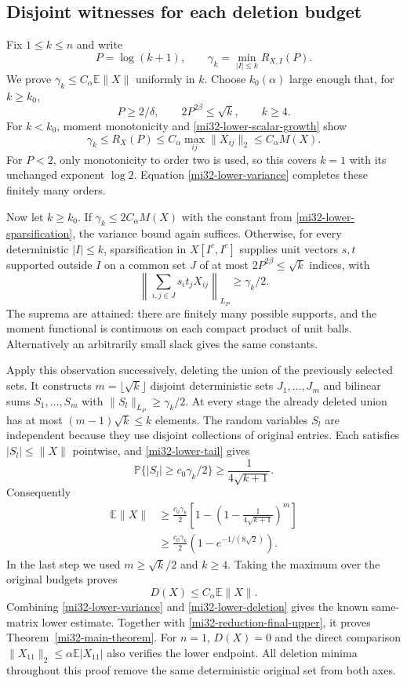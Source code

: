 \documentclass[11pt]{article}
\theoremstyle{definition}
\theoremstyle{remark}
\newcommand{\E}{\mathbb E}
\newcommand{\Prob}{\mathbb P}
\newcommand{\norm}[1]{\lVert#1\rVert}
\begin{document}
\subsection{Disjoint witnesses for each deletion budget}

Fix $1\le k\le n$ and write
\[
 P=\log(k+1),\qquad
 \gamma_k=\min_{|I|\le k}R_{X,I}(P).
\]
We prove $\gamma_k\le C_\alpha\E\norm{X}$ uniformly in $k$.
Choose $k_0(\alpha)$ large enough that, for $k\ge k_0$,
\[
 P\ge2/\delta,\qquad 2P^{2\beta}\le\sqrt k,\qquad k\ge4.
\]
For $k<k_0$, moment monotonicity and
\eqref{mi32-lower-scalar-growth} show
\[
 \gamma_k\le R_X(P)
 \le C_\alpha\max_{ij}\norm{X_{ij}}_2
 \le C_\alpha M(X).
\]
For $P<2$, only monotonicity to order two is used, so this covers
$k=1$ with its unchanged exponent $\log2$. Equation
\eqref{mi32-lower-variance} completes these finitely many orders.

Now let $k\ge k_0$. If $\gamma_k\le2C_\alpha M(X)$ with the
constant from \eqref{mi32-lower-sparsification}, the variance
bound again suffices. Otherwise, for every deterministic
$|I|\le k$, sparsification in $X[I^c,I^c]$ supplies unit vectors
$s,t$ supported outside $I$ on a common set $J$ of at most
$2P^{2\beta}\le\sqrt k$ indices, with
\[
 \left\|\sum_{i,j\in J}s_it_jX_{ij}\right\|_{L_P}
       \ge\gamma_k/2.
\]
The suprema are attained: there are finitely many possible supports,
and the moment functional is continuous on each compact product of
unit balls. Alternatively an arbitrarily small slack gives the
same constants.

Apply this observation successively, deleting the union of the
previously selected sets. It constructs
$m=\lfloor\sqrt k\rfloor$ disjoint deterministic sets $J_1,\ldots,J_m$
and bilinear sums $S_1,\ldots,S_m$ with
$\norm{S_l}_{L_P}\ge\gamma_k/2$. At every stage the already
deleted union has at most $(m-1)\sqrt k\le k$ elements.
The random variables $S_l$ are independent because they use disjoint
collections of original entries. Each satisfies $|S_l|\le\norm{X}$
pointwise, and \eqref{mi32-lower-tail} gives
\[
 \Prob\{|S_l|\ge c_0\gamma_k/2\}
       \ge\frac1{4\sqrt{k+1}}.
\]
Consequently
\[
 \begin{split}
 \E\norm{X}
 &\ge\frac{c_0\gamma_k}{2}
   \left[1-\left(1-\frac1{4\sqrt{k+1}}\right)^m\right]\\
 &\ge\frac{c_0\gamma_k}{2}
       \left(1-e^{-1/(8\sqrt2)}\right).
 \end{split}
\]
In the last step we used $m\ge\sqrt k/2$ and $k\ge4$.
Taking the maximum over the original budgets proves
\begin{equation}\label{mi32-lower-deletion}
 D(X)\le C_\alpha\E\norm{X}.
\end{equation}
Combining \eqref{mi32-lower-variance} and
\eqref{mi32-lower-deletion} gives the known same-matrix lower
estimate. Together with \eqref{mi32-reduction-final-upper}, it
proves Theorem~\ref{mi32-main-theorem}.
For $n=1$, $D(X)=0$ and the direct comparison
$\norm{X_{11}}_2\le\alpha\E|X_{11}|$ also verifies the lower
endpoint. All deletion minima throughout this proof remove the
same deterministic original set from both axes.
\end{document}
